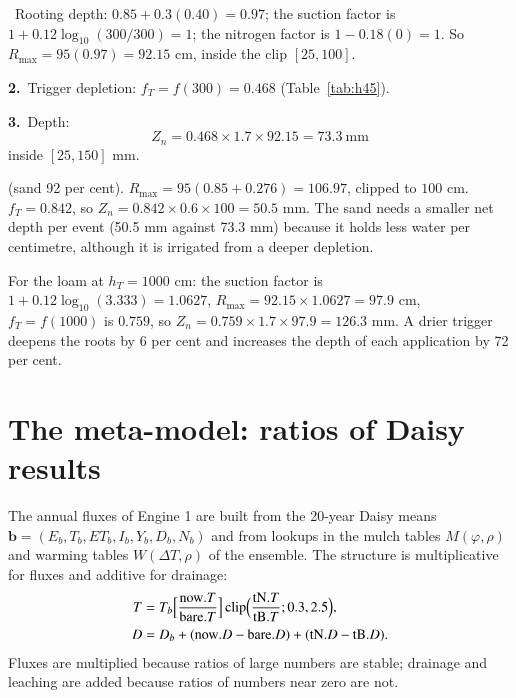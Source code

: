 \sol {}\ Rooting depth: $0.85+0.3(0.40)=0.97$; the suction factor is $1+0.12\log_{10}(300/300)=1$; the nitrogen factor is $1-0.18(0)=1$. So $R_{\max}=95(0.97)=92.15$ cm, inside the clip $[25,100]$. \finans

{\bfseries\color{khmag}2.}\ Trigger depletion: $f_T=f(300)=0.468$ (Table~\ref{tab:h45}).

{\bfseries\color{khmag}3.}\ Depth: \[Z_n=0.468\times1.7\times92.15=73.3\ \text{mm}\]
inside $[25,150]$ mm.

 (sand 92 per cent). $R_{\max}=95(0.85+0.276)=106.97$, clipped to $100$ cm. $f_T=0.842$, so $Z_n=0.842\times0.6\times100=50.5$ mm. The sand needs a smaller net depth per event (50.5 mm against 73.3 mm) because it holds less water per centimetre, although it is irrigated from a deeper depletion.

 For the loam at $h_T=1000$ cm: the suction factor is $1+0.12\log_{10}(3.333)=1.0627$, $R_{\max}=92.15\times1.0627=97.9$ cm, $f_T=f(1000)$ is $0.759$, so $Z_n=0.759\times1.7\times97.9=126.3$ mm. A drier trigger deepens the roots by 6 per cent and increases the depth of each application by 72 per cent.


\section{The meta-model: ratios of Daisy results}
The annual fluxes of Engine 1 are built from the 20-year Daisy means $\mathbf b=(E_b,T_b,ET_b,I_b,Y_b,D_b,N_b)$ and from lookups in the mulch tables $M(\varphi,\rho)$ and warming tables $W(\Delta T,\rho)$ of the ensemble. The structure is multiplicative for fluxes and additive for drainage:
\begin{align}
T&=T_b\Bigl[\frac{\mathrm{now}.T}{\mathrm{bare}.T}\Bigr]\,\mathrm{clip}\Bigl(\frac{\mathrm{tN}.T}{\mathrm{tB}.T};0.3,2.5\Bigr),\label{eq:mT}\\
D&=D_b+(\mathrm{now}.D-\mathrm{bare}.D)+(\mathrm{tN}.D-\mathrm{tB}.D).\label{eq:mD}
\end{align}
Fluxes are multiplied because ratios of large numbers are stable; drainage and leaching are added because ratios of numbers near zero are not.

